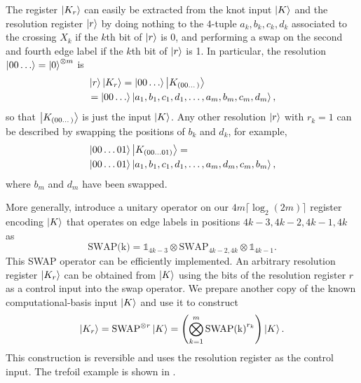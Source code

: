 \documentclass[a4paper,onecolumn,unpublished]{quantumarticle}
\theoremstyle{plain}
\theoremstyle{definition}
\theoremstyle{definition}
\numberwithin{equation}{section}
\newcommand{\tens}{\otimes}
\begin{document}
The register $\ket{K_r}$ can easily be extracted from the knot input $\ket{K}$ and the resolution register $\ket{r}$ by doing nothing to the $4$-tuple $a_k, b_k, c_k, d_k$ associated to the crossing $X_k$ if the $k$th bit of $\ket{r}$ is 0, and performing a swap on the second and fourth edge label if the $k$th bit of $\ket{r}$ is 1.  In particular, the resolution $\ket{00\dots} = \ket{0}^{\tens m}$ is 
\begin{equation*}
\begin{split}
   &\ket{r}\ket{K_r} =  \ket{00\dots}\ket{K_{(00\dots)}} \\ 
   &  = \ket{00\dots}\ket{a_1,b_1,c_1,d_1,\dots,a_m,b_m,c_m,d_m},
\end{split}
\end{equation*} 
so that $\ket{K_{ (00\dots) }}$ is just the input $\ket{K}$. Any other resolution $\ket{r}$ with $r_k=1$ can be described by swapping the positions of $b_k$ and $d_k$, for example,
\begin{equation*}
\begin{split}
      & \ket{00\dots01}\ket{K_{(00\dots01)}} =  \\
       & \ket{00\dots 01}\ket{a_1,b_1,c_1,d_1,\dots,a_m,d_m,c_m,b_m}, 
\end{split}
\end{equation*} where $b_m$ and $d_m$ have been swapped. 

More generally, introduce a unitary operator on our $4m\lceil\log_2(2m)\rceil$ register encoding $\ket{K}$ that  operates on edge labels in positions $4k-3,4k-2,4k-1,4k$ as 
\begin{equation} \label{eq:SWAP}
    \text{SWAP(k)} = \mathbb{1}_{4k-3} \tens \text{SWAP}_{4k-2,4k}\tens \mathbb{1}_{4k-1}.
\end{equation} 
This SWAP operator can be efficiently implemented. An arbitrary resolution register $\ket{K_r}$ can be obtained from $\ket{K}$ using the bits of the resolution register $r$ as a control input into the swap operator.   We prepare another copy of the known computational-basis input $\ket{K}$ and use it to construct  
 \begin{equation}
    \ket{K_r} = \text{SWAP}^{\tens r} \ket{K} =\left(\bigotimes_{k=1}^m \text{SWAP(k)}^{r_k} \right)\ket{K}.
\end{equation}
This construction is reversible and uses the resolution register as the control input.  The trefoil example is shown in .
\end{document}
